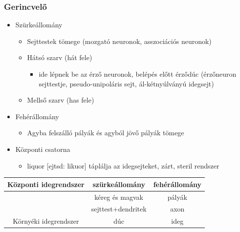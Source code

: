 \documentclass{article}
\begin{document}
\subsubsection{Gerincvelő}
\begin{itemize}
    \item Szürkeállomány \begin{itemize}
        \item Sejttestek tömege (mozgató neuronok, asszociációs neuronok)
        \item Hátsó szarv (hát fele) \begin{itemize}
            \item ide lépnek be az érző neuronok, belépés előtt érződúc (érzőneuron sejttestje, pseudo-unipoláris sejt, ál-kétnyúlványú idegsejt)
        \end{itemize}
        \item Mellső szarv (has fele)
    \end{itemize}
    \item Fehérállomány \begin{itemize}
        \item Agyba felszálló pályák és agyból jövő pályák tömege
    \end{itemize}
    \item Központi csatorna \begin{itemize}
        \item liquor [ejtsd: likuor] táplálja az idegsejteket, zárt, steril rendszer
    \end{itemize}
\end{itemize}

\begin{tabular}{|c|c|c|}
    \hline
     Központi idegrendszer & szürkeállomány & fehérállomány \\
     \hline
     & kéreg és magvak & pályák \\
     & sejttest+dendritek & axon \\
     \hline
     Környéki idegrendszer & dúc & ideg \\
     \hline
\end{tabular}



\end{document}
